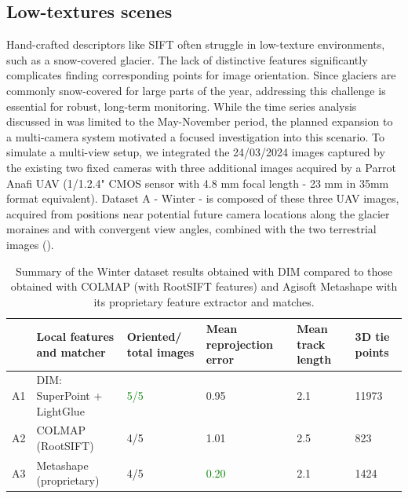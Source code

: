 \subsection{Low-textures scenes}

Hand-crafted descriptors like SIFT often struggle in low-texture environments, such as a snow-covered glacier.  
The lack of distinctive features significantly complicates finding corresponding points for image orientation. 
Since glaciers are commonly snow-covered for large parts of the year, addressing this challenge is essential for robust, long-term monitoring.
While the time series analysis discussed in was limited to the May-November period, the planned expansion to a multi-camera system motivated a focused investigation into this scenario. 
To simulate a multi-view setup, we integrated the 24/03/2024 images captured by the existing two fixed cameras with three additional images acquired by a Parrot Anafi UAV (1/1.2.4" CMOS sensor with 4.8 mm focal length - 23 mm in 35mm format equivalent).
Dataset A - Winter - is composed of these three UAV images, acquired from positions near potential future camera locations along the glacier moraines and with convergent view angles, combined with the two terrestrial images ().

\begin{table}[ht]
    \centering
    \caption{Summary of the Winter dataset results obtained with DIM compared to those obtained with COLMAP (with RootSIFT features) and Agisoft Metashape with its proprietary feature extractor and matches.} 
    \label{tab:5:winter_statistics}
    
    \begin{tabular}{l p{3.5cm} p{2.2cm} p{2.2cm} p{2.2cm} p{2.2cm}}
    \toprule
    &Local features \newline and matcher & Oriented/ \newline total images & Mean reprojection error \newline [px] & Mean track \newline length &  3D tie points\\
    \midrule
    A1 &DIM: SuperPoint \newline + LightGlue           & \textcolor{green}{5/5}     & 0.95 & 2.1  & 11973 \\
    A2 &COLMAP \newline (RootSIFT)                     & 4/5      & 1.01    & 2.5    & 823   \\
    A3 &Metashape \newline(proprietary)               & 4/5     & \textcolor{green}{0.20}  & 2.1   & 1424 \\
    \bottomrule
    \end{tabular}
\end{table}

